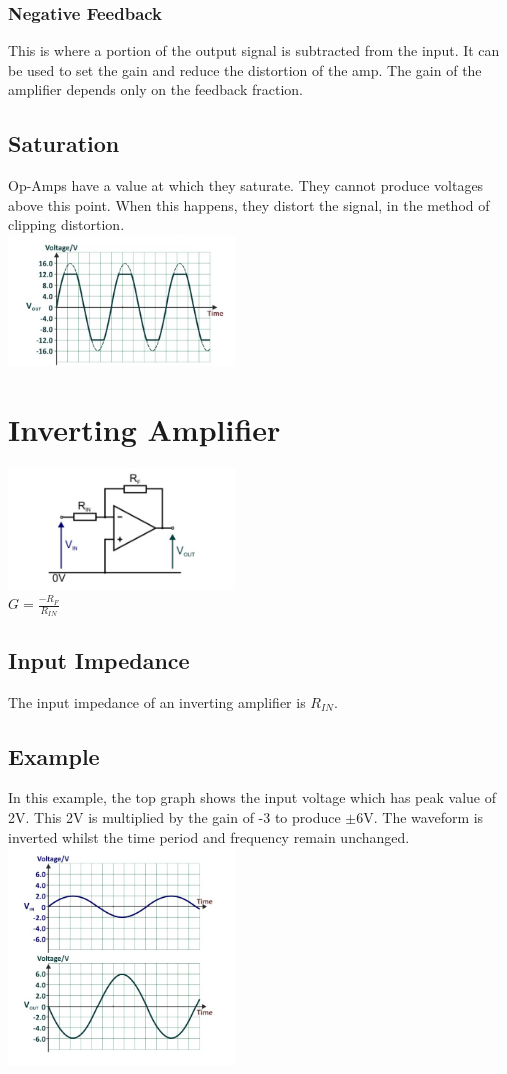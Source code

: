 \documentclass[a4paper,11pt, twocolumn]{article}
\begin{document}
\subsubsection{Negative Feedback}
This is where a portion of the output signal is subtracted from the input. It can be used to set the gain and reduce the distortion of the amp. The gain of the amplifier depends only on the feedback fraction.
\subsection{Saturation}
Op-Amps have a value at which they saturate. They cannot produce voltages above this point. When this happens, they distort the signal, in the method of clipping distortion.\\
\includegraphics[width=0.45\textwidth]{clippingDistortion.jpg}

\section{Inverting Amplifier}
\includegraphics[width=0.45\textwidth]{invertingAmp.jpg}\\
$\displaystyle G= \frac{-R_F}{R_{IN}}$
\subsection{Input Impedance}
The input impedance of an inverting amplifier is $R_{IN}$. 
\subsection{Example}
In this example, the top graph shows the input voltage which has peak value of 2V. This 2V is multiplied by the gain of -3 to produce $\pm$6V. The waveform is inverted whilst the time period and frequency remain unchanged.
\includegraphics[width=0.45\textwidth]{invAmp-1.jpg}
\end{document}
